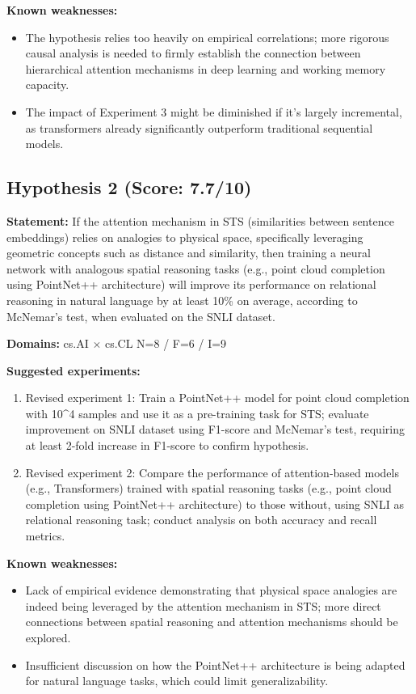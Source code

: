 \documentclass[12pt,a4paper]{article}
\begin{document}
\textbf{Known weaknesses:}
\begin{itemize}
  \item The hypothesis relies too heavily on empirical correlations; more rigorous causal analysis is needed to firmly establish the connection between hierarchical attention mechanisms in deep learning and working memory capacity.
  \item The impact of Experiment 3 might be diminished if it's largely incremental, as transformers already significantly outperform traditional sequential models.
\end{itemize}
\subsection*{Hypothesis 2 (Score: 7.7/10)}

\textbf{Statement:} If the attention mechanism in STS (similarities between sentence embeddings) relies on analogies to physical space, specifically leveraging geometric concepts such as distance and similarity, then training a neural network with analogous spatial reasoning tasks (e.g., point cloud completion using PointNet++ architecture) will improve its performance on relational reasoning in natural language by at least 10\% on average, according to McNemar's test, when evaluated on the SNLI dataset.

\noindent\textbf{Domains:} cs.AI $\times$ cs.CL
\hspace{1em} N=8 / F=6 / I=9

\textbf{Suggested experiments:}
\begin{enumerate}
  \item Revised experiment 1: Train a PointNet++ model for point cloud completion with 10\textasciicircum{}4 samples and use it as a pre-training task for STS; evaluate improvement on SNLI dataset using F1-score and McNemar's test, requiring at least 2-fold increase in F1-score to confirm hypothesis.
  \item Revised experiment 2: Compare the performance of attention-based models (e.g., Transformers) trained with spatial reasoning tasks (e.g., point cloud completion using PointNet++ architecture) to those without, using SNLI as relational reasoning task; conduct analysis on both accuracy and recall metrics.
\end{enumerate}

\textbf{Known weaknesses:}
\begin{itemize}
  \item Lack of empirical evidence demonstrating that physical space analogies are indeed being leveraged by the attention mechanism in STS; more direct connections between spatial reasoning and attention mechanisms should be explored.
  \item Insufficient discussion on how the PointNet++ architecture is being adapted for natural language tasks, which could limit generalizability.
\end{itemize}
\end{document}
